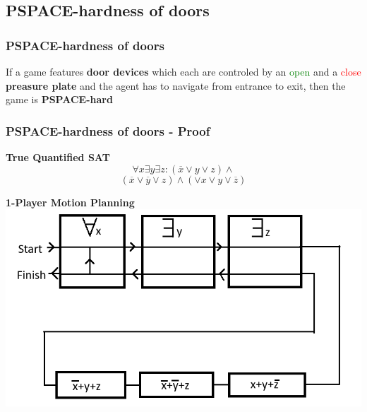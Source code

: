 \documentclass{beamer}
\begin{document}
\subsection{PSPACE-hardness of doors}
\begin{frame}
  \frametitle{PSPACE-hardness of doors}
  \begin{theorem}
    If a game features \textbf{door devices} which each are controled by an
    \textcolor{green}{open} and a \textcolor{red}{close} \textbf{preasure plate}
    and the agent has to navigate from entrance to exit, then the game is
    \textbf{PSPACE-hard}
  \end{theorem}
\end{frame}
\begin{frame}
  \frametitle{PSPACE-hardness of doors - Proof}
  \begin{minipage}[t]{0.48\textwidth}
    \textbf{True Quantified SAT}
    \[ \forall x \exists y \exists z :  (\overline{x} \lor y \lor z) \land \]
    \[ (\overline{x} \lor \overline{y} \lor z) \land (\lor x \lor y \lor \overline{z}) \]
  \end{minipage}
  \begin{minipage}[t]{0.48\textwidth}
    \textbf{1-Player Motion Planning}
    \includegraphics[width=1.20\textwidth]{res/Conversion.png}
  \end{minipage}
\end{frame}
\end{document}
